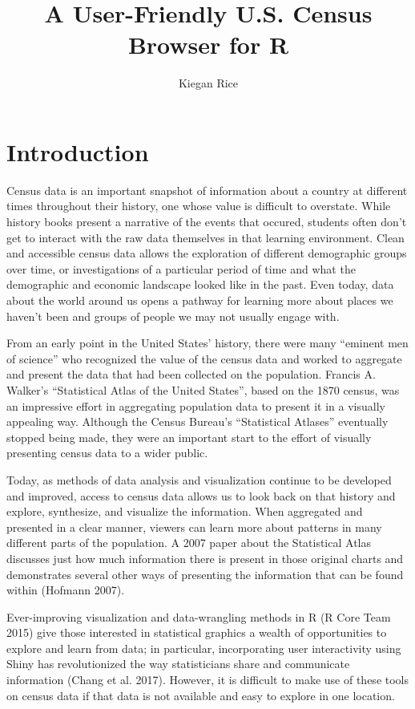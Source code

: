 \documentclass[11pt,]{article}
\title{A User-Friendly U.S. Census Browser for R}
\author{Kiegan Rice}
\date{}
\begin{document}
\maketitle

\section{Introduction}

Census data is an important snapshot of information about a country at
different times throughout their history, one whose value is difficult
to overstate. While history books present a narrative of the events that
occured, students often don't get to interact with the raw data
themselves in that learning environment. Clean and accessible census
data allows the exploration of different demographic groups over time,
or investigations of a particular period of time and what the
demographic and economic landscape looked like in the past. Even today,
data about the world around us opens a pathway for learning more about
places we haven't been and groups of people we may not usually engage
with.

From an early point in the United States' history, there were many
``eminent men of science'' who recognized the value of the census data
and worked to aggregate and present the data that had been collected on
the population. Francis A. Walker's ``Statistical Atlas of the United
States'', based on the 1870 census, was an impressive effort in
aggregating population data to present it in a visually appealing way.
Although the Census Bureau's ``Statistical Atlases'' eventually stopped
being made, they were an important start to the effort of visually
presenting census data to a wider public.

Today, as methods of data analysis and visualization continue to be
developed and improved, access to census data allows us to look back on
that history and explore, synthesize, and visualize the information.
When aggregated and presented in a clear manner, viewers can learn more
about patterns in many different parts of the population. A 2007 paper
about the Statistical Atlas discusses just how much information there is
present in those original charts and demonstrates several other ways of
presenting the information that can be found within (Hofmann 2007).

Ever-improving visualization and data-wrangling methods in R (R Core
Team 2015) give those interested in statistical graphics a wealth of
opportunities to explore and learn from data; in particular,
incorporating user interactivity using Shiny has revolutionized the way
statisticians share and communicate information (Chang et al. 2017).
However, it is difficult to make use of these tools on census data if
that data is not available and easy to explore in one location.
\end{document}
